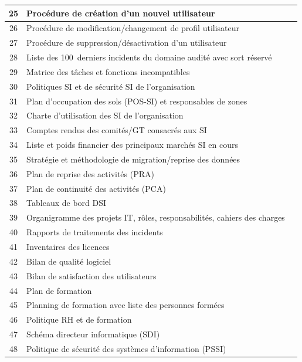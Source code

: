 \begin{longtable}{|c|p{8.5cm}|p{3.5cm}|}
    25 & Procédure de création d'un nouvel utilisateur & \\ \hline
    26 & Procédure de modification/changement de profil utilisateur & \\ \hline
    27 & Procédure de suppression/désactivation d'un utilisateur & \\ \hline
    28 & Liste des 100~derniers incidents du domaine audité avec sort réservé & \\ \hline
    29 & Matrice des tâches et fonctions incompatibles & \\ \hline
    30 & Politiques SI et de sécurité SI de l'organisation & \\ \hline
    31 & Plan d'occupation des sols (POS-SI) et responsables de zones & \\ \hline
    32 & Charte d'utilisation des SI de l'organisation & \\ \hline
    33 & Comptes rendus des comités/GT consacrés aux SI & \\ \hline
    34 & Liste et poids financier des principaux marchés SI en cours & \\ \hline
    35 & Stratégie et méthodologie de migration/reprise des données & \\ \hline
    36 & Plan de reprise des activités (PRA) & \\ \hline
    37 & Plan de continuité des activités (PCA) & \\ \hline
    38 & Tableaux de bord DSI & \\ \hline
    39 & Organigramme des projets IT, rôles, responsabilités, cahiers des charges & \\ \hline
    40 & Rapports de traitements des incidents & \\ \hline
    41 & Inventaires des licences & \\ \hline
    42 & Bilan de qualité logiciel & \\ \hline
    43 & Bilan de satisfaction des utilisateurs & \\ \hline
    44 & Plan de formation & \\ \hline
    45 & Planning de formation avec liste des personnes formées & \\ \hline
    46 & Politique RH et de formation & \\ \hline
    47 & Schéma directeur informatique (SDI) & \\ \hline
    48 & Politique de sécurité des systèmes d'information (PSSI) & \\ \hline
\end{longtable}

